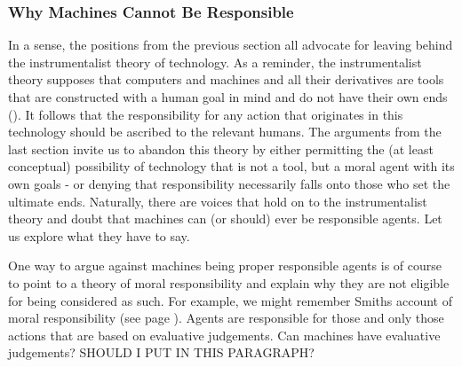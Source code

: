 \documentclass{article}
\newcounter{example}
\begin{document}



\subsubsection{Why Machines Cannot Be Responsible}
%


In a sense, the positions from the previous section all advocate for leaving behind
the instrumentalist theory of technology. As a reminder, the instrumentalist theory
supposes that computers and machines and all their derivatives are tools
that are constructed with a human goal in mind and do not have their own ends
(\cite[p. 308]{gunkel2020mind}). It follows that the responsibility for any
action that originates in this technology should be ascribed to the relevant
humans. The arguments from the last section invite us to abandon this 
theory by either permitting the (at least conceptual) possibility of technology
that is not a tool, but a moral agent with its own goals - or denying that
responsibility necessarily falls onto those who set the ultimate ends.
Naturally, there are voices that hold on to the instrumentalist theory and doubt
that machines can (or should) ever be responsible agents. Let us explore what
they have to say.

One way to argue against machines being proper responsible agents is of course to
point to a theory of moral responsibility and explain why they are not eligible
for being considered as such. For example, we might remember Smiths account of
moral responsibility (see page \pageref{smith}). Agents are responsible for
those and only those actions that are based on evaluative judgements. Can
machines have evaluative judgements?
SHOULD I PUT IN THIS PARAGRAPH?
\end{document}
